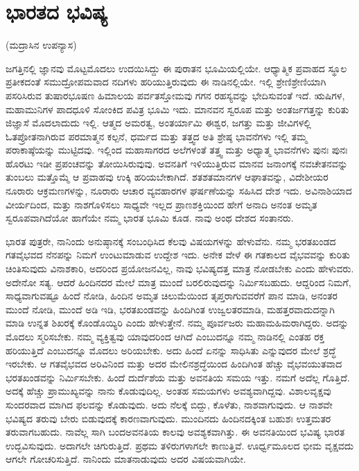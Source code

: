 
\chapter{ಭಾರತದ ಭವಿಷ್ಯ}

\begin{center}
(ಮದ್ರಾಸಿನ ಉಪನ್ಯಾಸ)
\end{center}

ಜಗತ್ತಿನಲ್ಲಿ ಜ್ಞಾನವು ಮೊಟ್ಟಮೊದಲು ಉದಯಿಸಿದ್ದು ಈ ಪುರಾತನ ಭೂಮಿಯಲ್ಲಿಯೇ. ಆಧ್ಯಾತ್ಮಿಕ ಪ್ರವಾಹದ ಸ್ಥೂಲ ಪ್ರತೀಕದಂತೆ ಸಮುದ್ರೋಪಮವಾದ ನದಿಗಳು ಹರಿಯುತ್ತಿರುವುದು ಈ ನಾಡಿನಲ್ಲಿಯೇ. ಇಲ್ಲಿ ಶ್ರೇಣಿಶ್ರೇಣಿಯಾಗಿ ಪಸರಿಸಿರುವ ತುಷಾರಭೂಷಣ ಹಿಮಾಲಯ ಪರ್ವತಸ್ತೋಮವು ಗಗನ ರಹಸ್ಯವನ್ನು ಭೇದಿಸುವಂತೆ ಇದೆ. ಋಷಿಗಳ, ಮಹಾಮುನಿಗಳ ಪಾದಧೂಳಿ ಸೋಂಕಿದ ಪವಿತ್ರ ಭೂಮಿ ಇದು. ಮಾನವನ ಸ್ವರೂಪ ಮತ್ತು ಅಂತರ್ಜಗತ್ತನ್ನು ಕುರಿತು ಜಿಜ್ಞಾಸೆ ಮೊದಲಾದುದು ಇಲ್ಲಿ. ಆತ್ಮದ ಅಮರತ್ವ, ಅಂತರ್ಯಾಮಿ ಈಶ್ವರ, ಜಗತ್ತು ಮತ್ತು ಜೀವಿಗಳಲ್ಲಿ ಓತಪ್ರೋತನಾಗಿರುವ ಪರಮಾತ್ಮನ ಕಲ್ಪನೆ, ಧರ್ಮದ ಮತ್ತು ತತ್ತ್ವದ ಅತಿ ಶ್ರೇಷ್ಠ ಭಾವನೆಗಳು ಇಲ್ಲಿ ತಮ್ಮ ಪರಾಕಾಷ್ಠೆಯನ್ನು ಮುಟ್ಟಿದವು. ಇಲ್ಲಿಂದ ಮಹಾಸಾಗರದ ಅಲೆಗಳಂತೆ ತತ್ತ್ವ ಮತ್ತು ಅಧ್ಯಾತ್ಮ ಭಾವನೆಗಳು ಪುನಃ ಪುನಃ ಹೊರಟು ಇಡೀ ಪ್ರಪಂಚವನ್ನು ತೋಯಿಸಿರು\-ವುವು. ಅವನತಿಗೆ ಇಳಿಯುತ್ತಿರುವ ಮಾನವ ಜನಾಂಗಕ್ಕೆ ನವಚೇತನವನ್ನು ತುಂಬಲು ಮತ್ತೊಮ್ಮೆ ಆ ಪ್ರವಾಹವು ಉಕ್ಕಿ ಹರಿಯಬೇಕಾಗಿದೆ. ಶತಶತಮಾನಗಳ ಆಘಾತವನ್ನು, ವಿದೇಶೀಯರ ನೂರಾರು ಆಕ್ರಮಣಗಳನ್ನು, ನೂರಾರು ಆಚಾರ ವ್ಯವಹಾರಗಳ ಘರ್ಷಣೆಯನ್ನು ಸಹಿಸಿದ ದೇಶ ಇದು. ಅವಿನಾಶಿಯಾದ ವೀರ್ಯದಿಂದ, ಮತ್ತು ನಾಶಗೊಳಿಸಲು ಸಾಧ್ಯವೇ ಇಲ್ಲದ ಪ್ರಾಣಶಕ್ತಿಯಿಂದ ಹೇಗೆ ಅನಾದಿ ಅನಂತ ಅಮೃತ ಸ್ವರೂಪವಾಗಿದೆಯೋ ಹಾಗೆಯೇ ನಮ್ಮ ಭಾರತ ಭೂಮಿ ಕೂಡ. ನಾವು ಅಂಥ ದೇಶದ ಸಂತಾನರು.

ಭಾರತ ಪುತ್ರರೇ, ನಾನಿಂದು ಅನುಷ್ಠಾನಕ್ಕೆ ಸಂಬಂಧಿಸಿದ ಕೆಲವು ವಿಷಯಗಳನ್ನು ಹೇಳುವೆನು. ನಮ್ಮ ಭರತಖಂಡದ ಗತವೈಭವದ ನೆನಪನ್ನು ನಿಮಗೆ ಉಂಟುಮಾಡುವ ಉದ್ದೇಶ ಇದು. ಅನೇಕ ವೇಳೆ ಈ ಗತಕಾಲದ ವೈಭವವನ್ನು ಕುರಿತು ಚಿಂತಿಸುವುದು ವಿನಾಶಕಾರಿ, ಅದರಿಂದ ಪ್ರಯೋಜನವಿಲ್ಲ, ನಾವು ಭವಿಷ್ಯದತ್ತ ಮಾತ್ರ ನೋಡಬೇಕು ಎಂದು ಹೇಳುವರು. ಅದೇನೋ ಸತ್ಯ. ಆದರೆ ಹಿಂದಿನದರ ಮೇಲೆ ಮಾತ್ರ ಮುಂದೆ ಬರಲಿರುವುದನ್ನು ನಿರ್ಮಿಸಬಹುದು. ಆದ್ದರಿಂದ ನಿಮಗೆ, ಸಾಧ್ಯವಾಗುವಷ್ಟೂ ಹಿಂದೆ ನೋಡಿ, ಹಿಂದಿನ ಅಮೃತ ಚಿಲುಮೆಯಿಂದ ತೃಪ್ತರಾಗುವವರೆಗೆ ಪಾನ ಮಾಡಿ, ಅನಂತರ ಮುಂದೆ ನೋಡಿ, ಮುಂದೆ ಅಡಿ ಇಡಿ, ಭರತಖಂಡವನ್ನು ಹಿಂದಿಗಿಂತ ಉಜ್ವಲತರಮಾಡಿ, ಮಹತ್ತರವಾದುದನ್ನಾಗಿ ಮಾಡಿ ಉನ್ನತ ಶಿಖರಕ್ಕೆ ಕೊಂಡೊಯ್ಯಿರಿ ಎಂದು ಹೇಳುತ್ತೇನೆ. ನಮ್ಮ ಪೂರ್ವಜರು ಮಹಾಮಹಿಮರಾಗಿದ್ದರು. ಅದನ್ನು ಮೊದಲು ಸ್ಮರಿಸಬೇಕು. ನಮ್ಮ ವ್ಯಕ್ತಿತ್ವವು ಯಾವುದರಿಂದ ಆಗಿದೆ ಎಂಬುದನ್ನೂ ನಮ್ಮ ನಾಡಿನಲ್ಲಿ ಎಂತಹ ರಕ್ತ ಹರಿಯುತ್ತಿದೆ ಎಂಬುದನ್ನೂ ಮೊದಲು ಅರಿಯಬೇಕು. ಅದು ಹಿಂದೆ ಏನನ್ನು ಸಾಧಿಸಿತು ಎನ್ನುವುದರ ಮೇಲೆ ಶ್ರದ್ಧೆ ಇರಬೇಕು. ಆ ಗತವೈಭವದ ಅರಿವಿನಿಂದ ಮತ್ತು ಅದರ ಮೇಲಿನಶ್ರದ್ಧೆಯಿಂದ ಹಿಂದಿಗಿಂತ ಹೆಚ್ಚು ವೈಭವಯುತವಾದ ಭರತಖಂಡವನ್ನು ನಿರ್ಮಿಸಬೇಕು. ಹಿಂದೆ ದುರ್ದೆಶೆಯ ಮತ್ತು ಅವನತಿಯ ಸಮಯ ಇತ್ತು. ನಮಗೆ ಅದೆಲ್ಲ ಗೊತ್ತಿದೆ. ಅದಕ್ಕೆ ಹೆಚ್ಚು ಪ್ರಾಮುಖ್ಯವನ್ನು ನಾನು ಕೊಡುವುದಿಲ್ಲ. ಅಂತಹ ಸಮಯಗಳು ಅವಶ್ಯವಾಗಿದ್ದವು. ವಿಶಾಲವೃಕ್ಷವು ಸುಂದರವಾದ ಮಾಗಿದ ಫಲವನ್ನು ಕೊಡುವುದು. ಅದು ನೆಲಕ್ಕೆ ಬಿದ್ದು, ಕೊಳೆತು, ನಾಶವಾಗುವುದು. ಆ ನಾಶವೇ ಭವಿಷ್ಯದ ತರುವು ಬೇರು ಬಿಡುವುದಕ್ಕೆ ಕಾರಣವಾಗುವುದು. ಮುಂದಿನದು ಹಿಂದಿನದಕ್ಕಿಂತ ಬಹುಶಃ ಉತ್ತಮತರ ತರುವಾಗಬಹುದು. ನಾವೆಲ್ಲ ಸಾಗಿ ಬಂದ\break ಅವನತಿಯ ಕಾಲವು ಅವಶ್ಯಕವಾಗಿತ್ತು. ಈ ಅವನತಿಯಿಂದ ಭವಿಷ್ಯ ಭಾರತ ಉದ್ಭವಿಸುವುದು. ಅದಾಗಲೇ ಚಿಗುರುತ್ತಿದೆ. ಪ್ರಥಮ ತಳಿರುಗಳಾಗಲೇ ಕಾಣುತ್ತಿವೆ. ಊರ್ಧ್ವಮೂಲದ ಭೀಮ ವೃಕ್ಷವದು ಆಗಲೇ ಗೋಚರಿಸುತ್ತಿದೆ. ನಾನಿಂದು ಮಾತನಾಡುವುದು ಅದರ ವಿಷಯವಾಗಿಯೇ.

